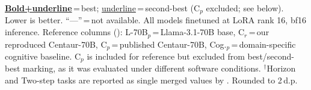 \begin{table}
\begin{minipage}{\ctrtblwd}
{\tiny \underline{\textbf{Bold+underline}}\,=\,best; \underline{underline}\,=\,second-best (C$_p$ excluded; see below). Lower is better. ``---''\,=\,not available. All models finetuned at LoRA rank 16, bf16 inference. Reference columns (\citet{binz2025foundation}): L-70B$_p$\,=\,Llama-3.1-70B base, C$_r$\,=\,our reproduced Centaur-70B, C$_p$\,=\,published Centaur-70B, Cog.$_p$\,=\,domain-specific cognitive baseline. C$_p$ is included for reference but excluded from best/second-best marking, as it was evaluated under different software conditions. $^\dagger$Horizon and Two-step tasks are reported as single merged values by \citet{binz2025foundation}. Rounded to 2\,d.p.}
\end{minipage}
\captionsetup{width=\ctrtblwd}
\caption{\textbf{Per-experiment NLL on Psych-101 for all four finetuned families (bf16, LoRA rank 16).} Cell colour encodes performance (green\,=\,better).}
\label{tab:psych101_pe_ft_all}
\end{table}

